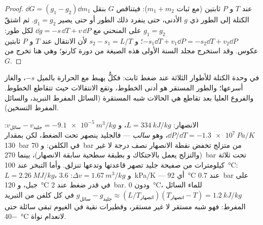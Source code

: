 \begin{proof}
$\dd G = (g_1 - g_2)\dd m_1$ عند $T$ و $P$ ثابتين (مع ثبات $m_1 + m_2$):
فيتناقص $G$ بنقل الكتلة إلى الطور ذي $g$ الأدنى، حتى ينفرد ذلك
الطور أو حتى يصير $g_1 = g_2$. ثم اشتقّ $g_1 = g_2$ على
المنحني مع $\dd g = -s\,\dd T + v\,\dd P$ لكل طور: $-s_1\dd T +
v_1\dd P = -s_2\dd T + v_2\dd P$؛ و $s_2 - s_1 = L/T$ لأن الانتقال
عند $T$ و $P$ ثابتين عكوس. وقد استخرج مجلد السنة الأولى هذه الصيغة
من دورة كارنو؛ وهي هنا تخرج من $G$.
\end{proof}

\begin{omfigure}

{\small {} في وحدة الكتلة للأطوار الثلاثة عند ضغط
ثابت: فكلٌّ يهبط مع الحرارة بالميل $-s$، والغاز
أسرعها؛ والطور المستقر هو أدنى الخطوط، وتقع الانتقالات
حيث تتقاطع الخطوط. والفروع العليا بعد تقاطع هي
الحالات شبه المستقرة (السائل المفرط التبريد، والسائل المفرط التسخين).}
\end{omfigure}

\begin{example}\label{ex:b2:thermodynamic-potentials:water}
الانصهار: $L = \qty{334}{kJ/kg}$، و $v_{\text{سائل}} - v_{\text{جليد}} = -\qty{9.1e-5}{m^3/kg}$:
$\dd P/\dd T = \qty{-1.3e7}{Pa/K}$، وهو \emph{سالب} --- فالجليد ينصهر تحت
الضغط، لكن بمقدار \qty{130}{bar} في الكلفن: و \qty{70}{bar} من متزلج تخفض
نقطة الانصهار نصف درجة لا غير (والتزلج يعمل بالاحتكاك و
بطبقة سطحية سابقة الانصهار)، بينما \qty{270}{bar} تحت ثلاثة
كيلومترات من صفيحة جليد تصهر قاعدتها وتدعها تنزلق. وأما التبخر عند
\qty{100}{\celsius}: $L = \qty{2.26}{MJ/kg}$، و $\Delta v = \qty{1.67}{m^3/kg}$:
\qty{3.6}{kPa/K} --- أي \qty{92}{\celsius} عند \qty{0.7}{bar} على جبل،
و \qty{120}{\celsius} في قدر ضغط عند \qty{2}{bar}. ودون
\qty{0}{\celsius}، للماء السائل $g_{\text{سائل}} - g_{\text{جليد}} \approx
(L/T_{\text{انصهار}})(T_{\text{انصهار}} - T) = \qty{1.2}{kJ/kg}$ في كل كلفن من
التبريد المفرط: فهو شبه مستقر لا غير مستقر، وقطيرات نقية في
الغيوم تبقى سائلة حتى \qty{-40}{\celsius} لانعدام نواة.
\end{example}

